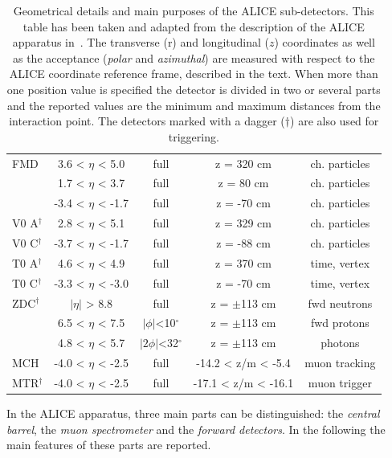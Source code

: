 \begin{table}[!tp]
\begin{tabular*}{\textwidth}{@{\extracolsep{\fill}}lcccc}
    FMD 	                 & 3.6 < $\eta$ < 5.0   & full			& z = 320 cm		& ch. particles\\
			                 & 1.7 < $\eta$ < 3.7	& full			& z = 80 cm		    & ch. particles\\
			                 & -3.4 < $\eta$ < -1.7 & full			& z = -70 cm		& ch. particles\\
	V0 A$^{\dagger}$         & 2.8 < $\eta$ < 5.1	& full			& z = 329 cm		& ch. particles\\
	V0 C$^{\dagger}$         & -3.7 < $\eta$ < -1.7	& full			& z = -88 cm		& ch. particles\\
	T0 A$^{\dagger}$         & 4.6 < $\eta$ < 4.9	& full			& z = 370 cm		& time, vertex\\
	T0 C$^{\dagger}$         & -3.3 < $\eta$ < -3.0	& full			& z = -70 cm		& time, vertex\\
	ZDC$^{\dagger}$		     & $|\eta|$ > 8.8	    & full			& z = $\pm$113 cm	& fwd neutrons\\
			                 & 6.5 < $\eta$ < 7.5	& $|\phi|$<10$^{\circ}$             & z = $\pm$113 cm	&fwd protons\\
			                 & 4.8 < $\eta$ < 5.7	& $|2\phi|$<32$^{\circ}$            & z = $\pm$113 cm   &photons\\
    \midrule
	MCH	                     & -4.0 < $\eta$ < -2.5 & full & -14.2 < z/m < -5.4  & muon tracking \\
	MTR$^{\dagger}$	         & -4.0 < $\eta$ < -2.5 & full & -17.1 < z/m < -16.1 & muon trigger \\	
    \bottomrule
    \end{tabular*}
    \vspace{2pt}
	\caption{Geometrical details and main purposes of the ALICE sub-detectors. This table has been taken and adapted from the description of the ALICE apparatus in~\cite{alice:Perf2014}. The transverse (r) and longitudinal ($z$) coordinates as well as the acceptance (\textit{polar} and \textit{azimuthal}) are measured with respect to the ALICE coordinate reference frame, described in the text. When more than one position value is specified the detector is divided in two or several parts and the reported values are the minimum and maximum distances from the interaction point. The detectors marked with a dagger ($\dagger$) are also used for triggering.}
	\label{tab:alice}
\end{table}
\endgroup

In the ALICE apparatus, three main parts can be distinguished: the \textit{central barrel}, the
\textit{muon spectrometer} and the \textit{forward detectors}.
In the following the main features of these parts are reported.
